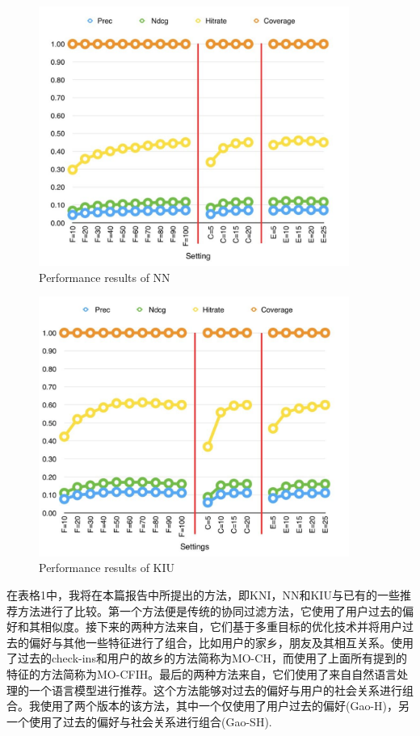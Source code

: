 \documentclass[UTF8]{ctexart}
\begin{document}
	\begin{figure}
		\begin{center}
			\includegraphics[width=4in]{5}
		\end{center}
		\caption{Performance results of NN}
	\end{figure}
	
	\begin{figure}
		\begin{center}
			\includegraphics[width=4in]{6}
		\end{center}
		\caption{Performance results of KIU}
	\end{figure}
	
	在表格1中，我将在本篇报告中所提出的方法，即KNI，NN和KIU与已有的一些推荐方法进行了比较。第一个方法便是传统的协同过滤方法，它使用了用户过去的偏好和其相似度。接下来的两种方法来自\cite{ozsoy2014multi}，它们基于多重目标的优化技术并将用户过去的偏好与其他一些特征进行了组合，比如用户的家乡，朋友及其相互关系。使用了过去的check-ins和用户的故乡的方法简称为MO-CH，而使用了上面所有提到的特征的方法简称为MO-CFIH。最后的两种方法来自\cite{gao2012exploring}，它们使用了来自自然语言处理的一个语言模型进行推荐。这个方法能够对过去的偏好与用户的社会关系进行组合。我使用了两个版本的该方法，其中一个仅使用了用户过去的偏好(Gao-H)，另一个使用了过去的偏好与社会关系进行组合(Gao-SH).
	
\end{document}
